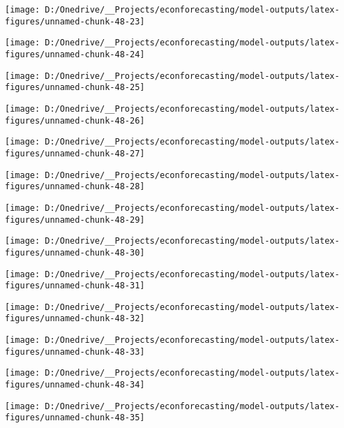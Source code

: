 \documentclass[11pt, letterpaper]{article}\usepackage[]{graphicx}\usepackage[]{color}
\begin{document}
{\centering \texttt{[image: D:/Onedrive/\_\_Projects/econforecasting/model-outputs/latex-figures/unnamed-chunk-48-23]} 

}




{\centering \texttt{[image: D:/Onedrive/\_\_Projects/econforecasting/model-outputs/latex-figures/unnamed-chunk-48-24]} 

}




{\centering \texttt{[image: D:/Onedrive/\_\_Projects/econforecasting/model-outputs/latex-figures/unnamed-chunk-48-25]} 

}




{\centering \texttt{[image: D:/Onedrive/\_\_Projects/econforecasting/model-outputs/latex-figures/unnamed-chunk-48-26]} 

}




{\centering \texttt{[image: D:/Onedrive/\_\_Projects/econforecasting/model-outputs/latex-figures/unnamed-chunk-48-27]} 

}




{\centering \texttt{[image: D:/Onedrive/\_\_Projects/econforecasting/model-outputs/latex-figures/unnamed-chunk-48-28]} 

}




{\centering \texttt{[image: D:/Onedrive/\_\_Projects/econforecasting/model-outputs/latex-figures/unnamed-chunk-48-29]} 

}




{\centering \texttt{[image: D:/Onedrive/\_\_Projects/econforecasting/model-outputs/latex-figures/unnamed-chunk-48-30]} 

}




{\centering \texttt{[image: D:/Onedrive/\_\_Projects/econforecasting/model-outputs/latex-figures/unnamed-chunk-48-31]} 

}




{\centering \texttt{[image: D:/Onedrive/\_\_Projects/econforecasting/model-outputs/latex-figures/unnamed-chunk-48-32]} 

}




{\centering \texttt{[image: D:/Onedrive/\_\_Projects/econforecasting/model-outputs/latex-figures/unnamed-chunk-48-33]} 

}




{\centering \texttt{[image: D:/Onedrive/\_\_Projects/econforecasting/model-outputs/latex-figures/unnamed-chunk-48-34]} 

}




{\centering \texttt{[image: D:/Onedrive/\_\_Projects/econforecasting/model-outputs/latex-figures/unnamed-chunk-48-35]} 

}
\end{document}
